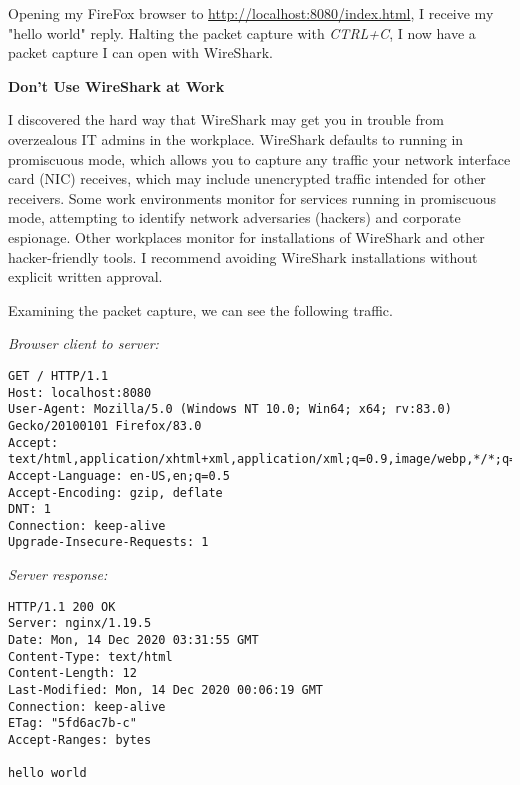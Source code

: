 Opening my FireFox browser to \url{http://localhost:8080/index.html}, I receive my "hello world" reply.  Halting the packet capture with \textit{CTRL+C}, I now have a packet capture I can open with WireShark.

\begin{sidebar}
\begin{center}
\textbf{Don't Use WireShark at Work}
\end{center}
I discovered the hard way that WireShark may get you in trouble from overzealous IT admins in the workplace.  WireShark defaults to running in promiscuous mode, which allows you to capture any traffic your network interface card (NIC) receives, which may include unencrypted traffic intended for other receivers.  Some work environments monitor for services running in promiscuous mode, attempting to identify network adversaries (hackers) and corporate espionage.  Other workplaces monitor for installations of WireShark and other hacker-friendly tools.  I recommend avoiding WireShark installations without explicit written approval.
\end{sidebar}

Examining the packet capture, we can see the following traffic.

\begin{minipage}{\linewidth}

\textit{Browser client to server:}

\begin{code}
\vspace{-\baselineskip}
\begin{lstlisting}[belowskip=-\baselineskip]
GET / HTTP/1.1
Host: localhost:8080
User-Agent: Mozilla/5.0 (Windows NT 10.0; Win64; x64; rv:83.0) Gecko/20100101 Firefox/83.0
Accept: text/html,application/xhtml+xml,application/xml;q=0.9,image/webp,*/*;q=0.8
Accept-Language: en-US,en;q=0.5
Accept-Encoding: gzip, deflate
DNT: 1
Connection: keep-alive
Upgrade-Insecure-Requests: 1
\end{lstlisting}
\end{code}

\textit{Server response:}

\begin{code}
\vspace{-\baselineskip}
\begin{lstlisting}[belowskip=-\baselineskip]
HTTP/1.1 200 OK
Server: nginx/1.19.5
Date: Mon, 14 Dec 2020 03:31:55 GMT
Content-Type: text/html
Content-Length: 12
Last-Modified: Mon, 14 Dec 2020 00:06:19 GMT
Connection: keep-alive
ETag: "5fd6ac7b-c"
Accept-Ranges: bytes

hello world
\end{lstlisting}
\end{code}

\end{minipage}

